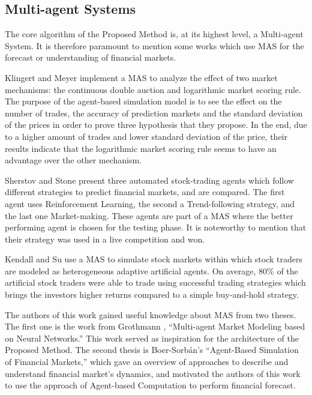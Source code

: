 \documentclass[review]{elsarticle}
\begin{document}
\subsection{Multi-agent Systems}
\label{multi-agent-systems}

The core algorithm of the Proposed Method is, at its highest level, a Multi-agent System. It is therefore paramount to mention some works which use MAS for the forecast or understanding of financial markets.

Klingert and Meyer \cite{Klingert_2012} implement a MAS to analyze the effect of two market mechanisms: the continuous double auction and logarithmic market scoring rule. The purpose of the agent-based simulation model is to see the effect on the number of trades, the accuracy of prediction markets and the standard deviation of the prices in order to prove three hypothesis that they propose. In the end, due to a higher amount of trades and lower standard deviation of the price, their results indicate that the logarithmic market scoring rule seems to have an advantage over the other mechanism.

Sherstov and Stone \cite{Sherstov2005} present three automated stock-trading agents which follow different strategies to predict financial markets, and are compared. The first agent uses Reinforcement Learning, the second a Trend-following strategy, and the last one Market-making. These agents are part of a MAS where the better performing agent is chosen for the testing phase. It is noteworthy to mention that their strategy was used in a live competition and won.

Kendall and Su \cite{Kendall2003} use a MAS to simulate stock markets within which stock traders are modeled as heterogeneous adaptive artificial agents. On average, 80\% of the artificial stock traders were able to trade using successful trading strategies which brings the investors higher returns compared to a simple buy-and-hold strategy.

The authors of this work gained useful knowledge about MAS from two theses. The first one is the work from Grothmann \cite{Grothmann2002}, ``Multi-agent Market Modeling based on Neural Networks.'' This work served as inspiration for the architecture of the Proposed Method. The second thesis is Boer-Sorb{\'{a}}n's ``Agent-Based Simulation of Financial Markets,'' which gave an overview of approaches to describe and understand financial market's dynamics, and motivated the authors of this work to use the approach of Agent-based Computation to perform financial forecast.
\end{document}
